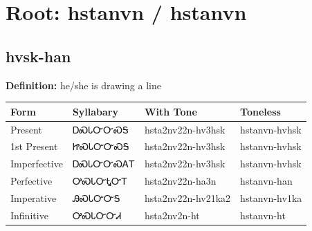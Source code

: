 \documentclass{article}%
\begin{document}
%
\normalsize%
\section*{Root: hstanvn / hstanvn}%
\subsection*{hvsk-han}%
\textbf{Definition: }%
he/she is drawing a line%
\\[0.5em]%
\begin{tabular}{|l|l|l|l|}%
\hline%
\textbf{Form}&\textbf{Syllabary}&\textbf{With Tone}&\textbf{Toneless}\\%
\hline%
Present&ᎠᏍᏓᏅᏅᏍᎦ&hsta2nv22n{-}hv3hsk&hstanvn{-}hvhsk\\%
1st Present&ᏥᏍᏓᏅᏅᏍᎦ&hsta2nv22n{-}hv3hsk&hstanvn{-}hvhsk\\%
Imperfective&ᎠᏍᏓᏅᏅᏍᎪᎢ&hsta2nv22n{-}hv3hsk&hstanvn{-}hvhsk\\%
Perfective&ᎤᏍᏓᏅᎿᏅᎢ&hsta2nv22n{-}ha3n&hstanvn{-}han\\%
Imperative&ᎯᏍᏓᏅᏅᎦ&hsta2nv22n{-}hv21ka2&hstanvn{-}hv1ka\\%
Infinitive&ᎤᏍᏓᏅᏅᏗ&hsta2nv2n{-}ht&hstanvn{-}ht\\%
\hline%
\end{tabular}%
\\[1em]%
\end{document}
